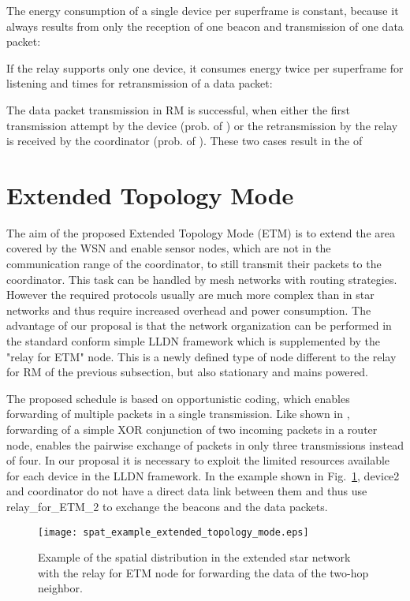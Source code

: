 \documentclass[times,10pt,twocolumn]{article}
\begin{document}
The energy consumption of a single device per superframe is constant, because it always results from only the reception of one beacon and transmission of one data packet:


If the relay supports only one device, it consumes energy twice per superframe for listening and  times for retransmission of a data packet:


The data packet transmission in RM is successful, when either the first transmission attempt by the device (prob. of ) or the retransmission by the relay is received by the coordinator (prob. of ). These two cases result in the  of



\section{Extended Topology Mode}
\label{section_extended_topology_mode}

The aim of the proposed Extended Topology Mode (ETM) is to extend the area covered by the WSN and enable sensor nodes, which are not in the communication range of the coordinator, to still transmit their packets to the coordinator. This task can be handled by mesh networks with routing strategies. However the required protocols usually are much more complex than in star networks and thus require increased overhead and power consumption. The advantage of our proposal is that the network organization can be performed in the standard conform simple LLDN framework which is supplemented by the "relay for ETM" node. This is a newly defined type of node different to the relay for RM of the previous subsection, but also stationary and mains powered.

The proposed schedule is based on opportunistic coding, which enables forwarding of multiple packets in a single transmission. Like shown in \cite{XORs_in_the_air}, forwarding of a simple XOR conjunction of two incoming packets in a router node, enables the pairwise exchange of packets in only three transmissions instead of four. In our proposal it is necessary to exploit the limited resources available for each device in the LLDN framework. In the example shown in Fig.~\ref{fig_spat_distr_extended_topology_proposal}, device2 and coordinator do not have a direct data link between them and thus use relay\_for\_ETM\_2 to exchange the beacons and the data packets.

\begin{figure}[!h]
\centering
\texttt{[image: spat\_example\_extended\_topology\_mode.eps]}
\caption{Example of the spatial distribution in the extended star network with the relay for ETM node for forwarding the data of the two-hop neighbor.}
    \label{fig_spat_distr_extended_topology_proposal}
\end{figure}
\end{document}
